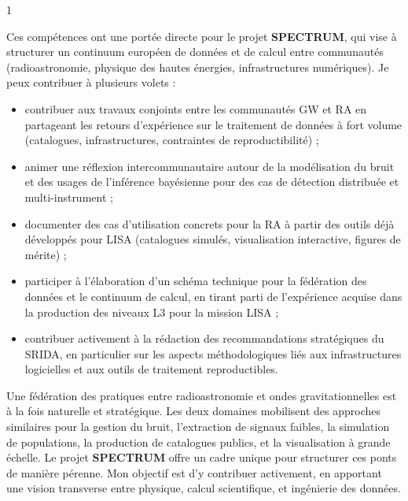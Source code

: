 \documentclass[10pt,a4paper]{altacv}
\begin{document}
\begin{paracol}{1}
{Ces compétences ont une portée directe pour le projet \textbf{SPECTRUM}, qui vise à structurer un continuum européen de données et de calcul entre communautés (radioastronomie, physique des hautes énergies, infrastructures numériques). Je peux contribuer à plusieurs volets :
\begin{itemize}
  \item contribuer aux travaux conjoints entre les communautés GW et RA en partageant les retours d'expérience sur le traitement de données à fort volume (catalogues, infrastructures, contraintes de reproductibilité) ;
  \item animer une réflexion intercommunautaire autour de la modélisation du bruit et des usages de l'inférence bayésienne pour des cas de détection distribuée et multi-instrument ;
  \item documenter des cas d'utilisation concrets pour la RA à partir des outils déjà développés pour LISA (catalogues simulés, visualisation interactive, figures de mérite) ;
  \item participer à l'élaboration d'un schéma technique pour la fédération des données et le continuum de calcul, en tirant parti de l'expérience acquise dans la production des niveaux L3 pour la mission LISA ;
  \item contribuer activement à la rédaction des recommandations stratégiques du SRIDA, en particulier sur les aspects méthodologiques liés aux infrastructures logicielles et aux outils de traitement reproductibles.
\end{itemize}


Une fédération des pratiques entre radioastronomie et ondes gravitationnelles est à la fois naturelle et stratégique. Les deux domaines mobilisent des approches similaires pour la gestion du bruit, l'extraction de signaux faibles, la simulation de populations, la production de catalogues publics, et la visualisation à grande échelle. Le projet \textbf{SPECTRUM} offre un cadre unique pour structurer ces ponts de manière pérenne. Mon objectif est d'y contribuer activement, en apportant une vision transverse entre physique, calcul scientifique, et ingénierie des données.


}


\end{paracol}
\end{document}
